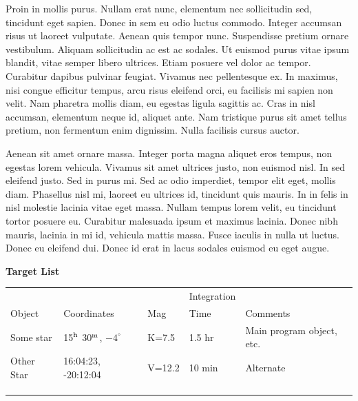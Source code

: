 \documentclass{lowell-prop}
\begin{document}

\observingRequest 

Proin in mollis purus. Nullam erat nunc, elementum nec sollicitudin
sed, tincidunt eget sapien. Donec in sem eu odio luctus
commodo. Integer accumsan risus ut laoreet vulputate. Aenean quis
tempor nunc. Suspendisse pretium ornare vestibulum. Aliquam
sollicitudin ac est ac sodales. Ut euismod purus vitae ipsum blandit,
vitae semper libero ultrices. Etiam posuere vel dolor ac
tempor. Curabitur dapibus pulvinar feugiat. Vivamus nec pellentesque
ex. In maximus, nisi congue efficitur tempus, arcu risus eleifend
orci, eu facilisis mi sapien non velit. Nam pharetra mollis diam, eu
egestas ligula sagittis ac. Cras in nisl accumsan, elementum neque id,
aliquet ante. Nam tristique purus sit amet tellus pretium, non
fermentum enim dignissim. Nulla facilisis cursus auctor.

Aenean sit amet ornare massa. Integer porta magna aliquet eros tempus,
non egestas lorem vehicula. Vivamus sit amet ultrices justo, non
euismod nisl. In sed eleifend justo. Sed in purus mi. Sed ac odio
imperdiet, tempor elit eget, mollis diam. Phasellus nisl mi, laoreet
eu ultrices id, tincidunt quis mauris. In in felis in nisl molestie
lacinia vitae eget massa. Nullam tempus lorem velit, eu tincidunt
tortor posuere eu. Curabitur malesuada ipsum et maximus lacinia. Donec
nibh mauris, lacinia in mi id, vehicula mattis massa. Fusce iaculis in
nulla ut luctus. Donec eu eleifend dui. Donec id erat in lacus sodales
euismod eu eget augue.

\clearpage



\begin{center}
{\bf Target List} \\[2em]
\begin{tabular}{l l l l l} 
\hline\hline 
&   &   &Integration&  \\
Object & Coordinates & Mag & Time & Comments \\ [0.5ex] 
\hline 
Some star  & 15$^{\rm h}$ 30$^{\rm m}$, $-4^{\circ}$ & 
K=7.5 & 1.5 hr & Main program object, etc. \\
Other Star & 16:04:23, -20:12:04 & V=12.2  & 10 min  & Alternate \\
   &   &   &   & \\
   &   &   &   & \\
   &   &   &   & \\  [1ex] 
\hline 
\end{tabular}
\end{center}
\end{document}
